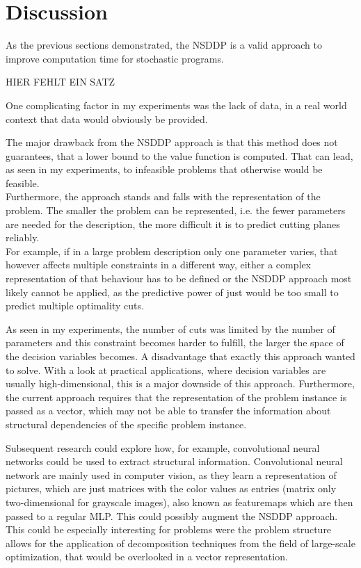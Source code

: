 \section{Discussion}\label{Discussion}
As the previous sections demonstrated, the NSDDP is a valid approach to improve computation time for stochastic programs.

HIER FEHLT EIN SATZ

One complicating factor in my experiments was the lack of data, in a real world context that data would obviously be provided.

The major drawback from the NSDDP approach is that this method does not guarantees, that a lower bound to the value function is computed.
That can lead, as seen in my experiments, to infeasible problems that otherwise would be feasible. \\
Furthermore, the approach stands and falls with the representation of the problem.
The smaller the problem can be represented, i.e. the fewer parameters are needed for the description, the more difficult it is to predict cutting planes reliably. \\
For example, if in a large problem description only one parameter varies, that however affects multiple constraints in a different way, either a complex representation of that behaviour has to be defined or the NSDDP approach most likely cannot be applied, as the predictive power of just would be too small to predict multiple optimality cuts.

As seen in my experiments, the number of cuts was limited by the number of parameters and this constraint becomes harder to fulfill, the larger the space of the decision variables becomes.
A disadvantage that exactly this approach wanted to solve.
With a look at practical applications, where decision variables are usually high-dimensional, this is a major downside of this approach.
Furthermore, the current approach requires that the representation of the problem instance is passed as a vector, which may not be able to transfer the information about structural dependencies of the specific problem instance.

Subsequent research could explore how, for example, convolutional neural networks could be used to extract structural information.
Convolutional neural network are mainly used in computer vision, as they learn a representation of pictures, which are just matrices with the color values as entries (matrix only two-dimensional for grayscale images), also known as featuremaps \cite{ComputerVisionBook} which are then passed to a regular MLP.
This could possibly augment the NSDDP approach. \\
This could be especially interesting for problems were the problem structure allows for the application of decomposition techniques from the field of large-scale optimization, that would be overlooked in a vector representation.

